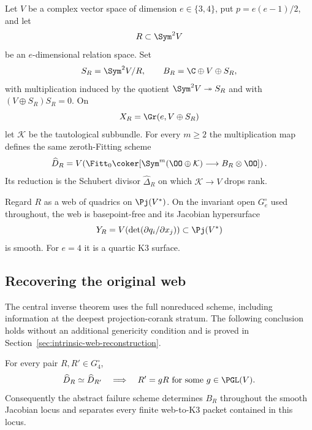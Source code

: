 Let \(V\) be a complex vector space of dimension
\(e\in\{3,4\}\), put \(p=e(e-1)/2\), and let
\[
 R\subset\Sym^2V
\]
be an \(e\)-dimensional relation space.  Set
\[
 S_R=\Sym^2V/R,\qquad
 B_R=\C\oplus V\oplus S_R,
\]
with multiplication induced by the quotient
\(\Sym^2V\twoheadrightarrow S_R\) and with
\((V\oplus S_R)S_R=0\).  On
\[
 X_R=\Gr(e,V\oplus S_R)
\]
let \(\mathcal K\) be the tautological subbundle.  For every
\(m\ge2\) the multiplication map defines the same zeroth-Fitting
scheme
\begin{equation}\label{eq:failure-intro}
 \widehat D_R=
 V\!\left(
 \Fitt_0\coker[
 \Sym^m(\OO\oplus\mathcal K)\longrightarrow
 B_R\otimes\OO]\right).
\end{equation}
Its reduction is the Schubert divisor
\(\widehat\Delta_R\) on which \(\mathcal K\to V\) drops rank.

Regard \(R\) as a web of quadrics on \(\Pj(V^*)\).  On the
invariant open \(G_e^\circ\) used throughout, the web is
basepoint-free and its Jacobian hypersurface
\begin{equation}\label{eq:Y-intro}
 Y_R=V\!\left(\det(\partial q_i/\partial x_j)\right)
 \subset\Pj(V^*)
\end{equation}
is smooth.  For \(e=4\) it is a quartic K3 surface.


\subsection{Recovering the original web}

The central inverse theorem uses the full nonreduced scheme,
including information at the deepest projection-corank stratum.  The
following conclusion holds without an additional genericity condition
and is proved in
Section~\ref{sec:intrinsic-web-reconstruction}.

\begin{theorem}
\label{thm:main-web-reconstruction}
For every pair \(R,R'\in G_4^\circ\),
\[
 \widehat D_R\simeq\widehat D_{R'}\quad\Longrightarrow\quad
 R'=gR\ \text{for some }g\in\PGL(V).
\]
Consequently the abstract failure scheme determines \(B_R\)
throughout the smooth Jacobian locus and separates every finite
web-to-K3 packet contained in this locus.
\end{theorem}

